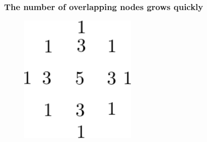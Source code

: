 \documentclass{beamer}
\begin{document}
\begin{frame}
 \frametitle{The number of overlapping nodes grows quickly}
 \begin{figure}
  \includegraphics[width=0.5\textwidth]{smolyak_nested_nr.png}
 \end{figure}

\end{frame}

%
%
\end{document}
